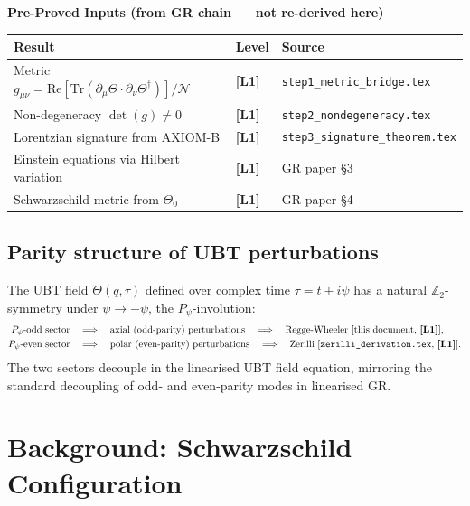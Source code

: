 \documentclass[12pt,a4paper]{article}
\theoremstyle{definition}
\theoremstyle{remark}
\newcommand{\Lone}{\textbf{[L1]}}
\newcommand{\calN}{\mathcal{N}}
\newcommand{\re}{\mathrm{Re}}
\newcommand{\Tr}{\mathrm{Tr}}
\begin{document}
\begin{resultbox}
\textbf{Pre-Proved Inputs (from GR chain — not re-derived here)}
\begin{center}
\begin{tabular}{lll}
\toprule
\textbf{Result} & \textbf{Level} & \textbf{Source} \\
\midrule
Metric $g_{\mu\nu} = \re[\Tr(\partial_\mu\Theta\cdot\partial_\nu\Theta^\dagger)]/\calN$ &
  \Lone & \texttt{step1\_metric\_bridge.tex} \\
Non-degeneracy $\det(g)\neq 0$ & \Lone & \texttt{step2\_nondegeneracy.tex} \\
Lorentzian signature from AXIOM-B & \Lone & \texttt{step3\_signature\_theorem.tex} \\
Einstein equations via Hilbert variation & \Lone & GR paper §3 \\
Schwarzschild metric from $\Theta_0$ & \Lone & GR paper §4 \\
\bottomrule
\end{tabular}
\end{center}
\end{resultbox}

\subsection{Parity structure of UBT perturbations}

The UBT field $\Theta(q,\tau)$ defined over complex time $\tau = t + i\psi$ has
a natural $\mathbb{Z}_2$-symmetry under $\psi \to -\psi$, the
$P_\psi$-involution:
\begin{align}
  P_\psi\text{-odd sector} &\quad\Longrightarrow\quad
    \text{axial (odd-parity) perturbations}
    \quad\Longrightarrow\quad \text{Regge-Wheeler [this document, \Lone]}, \\
  P_\psi\text{-even sector} &\quad\Longrightarrow\quad
    \text{polar (even-parity) perturbations}
    \quad\Longrightarrow\quad
    \text{Zerilli [\texttt{zerilli\_derivation.tex}, \Lone]}.
\end{align}
The two sectors decouple in the linearised UBT field equation, mirroring the
standard decoupling of odd- and even-parity modes in linearised GR.

\section{Background: Schwarzschild Configuration}
\label{sec:background}
\end{document}
